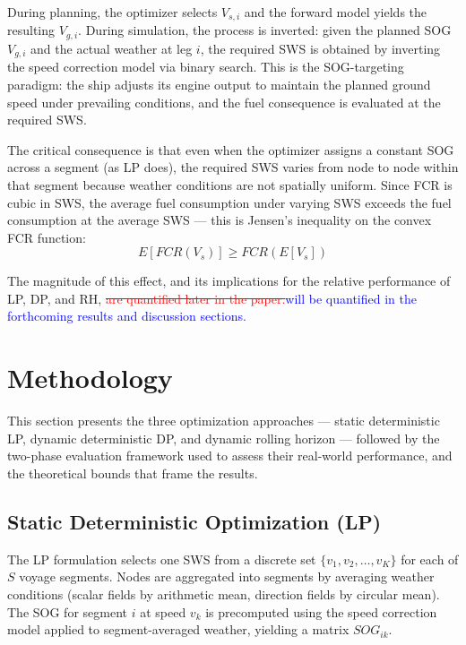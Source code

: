\documentclass[review,authoryear]{elsarticle}  %
\newcommand{\revadd}[1]{\textcolor{blue}{#1}}
\newcommand{\revdel}[1]{\textcolor{red}{\sout{#1}}}
\begin{document}
During planning, the optimizer selects $V_{s,i}$ and the forward model yields the resulting $V_{g,i}$. During simulation, the process is inverted: given the planned SOG $V_{g,i}$ and the actual weather at leg $i$, the required SWS is obtained by inverting the speed correction model via binary search. This is the SOG-targeting paradigm: the ship adjusts its engine output to maintain the planned ground speed under prevailing conditions, and the fuel consequence is evaluated at the required SWS.

The critical consequence is that even when the optimizer assigns a constant SOG across a segment (as LP does), the required SWS varies from node to node within that segment because weather conditions are not spatially uniform. Since FCR is cubic in SWS, the average fuel consumption under varying SWS exceeds the fuel consumption at the average SWS --- this is Jensen's inequality on the convex FCR function:
\begin{equation}
    E[FCR(V_s)] \geq FCR(E[V_s])
    \label{eq:jensen}
\end{equation}

The magnitude of this effect, and its implications for the relative performance of LP, DP, and RH, \revdel{are quantified later in the paper.}\revadd{will be quantified in the forthcoming results and discussion sections.}


\section{Methodology}
\label{sec:methodology}

This section presents the three optimization approaches --- static deterministic LP, dynamic deterministic DP, and dynamic rolling horizon --- followed by the two-phase evaluation framework used to assess their real-world performance, and the theoretical bounds that frame the results.

\subsection{Static Deterministic Optimization (LP)}
\label{sec:lp}

The LP formulation selects one SWS from a discrete set $\{v_1, v_2, \ldots, v_K\}$ for each of $S$ voyage segments. Nodes are aggregated into segments by averaging weather conditions (scalar fields by arithmetic mean, direction fields by circular mean). The SOG for segment $i$ at speed $v_k$ is precomputed using the speed correction model \citet{Yang2020} applied to segment-averaged weather, yielding a matrix $SOG_{ik}$.
\end{document}
